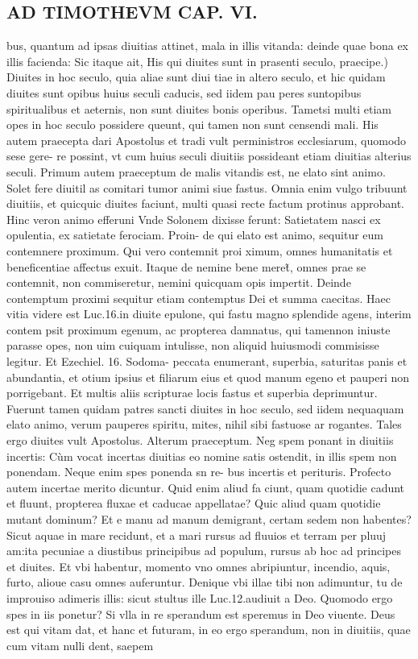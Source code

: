 \documentclass{article}
\begin{document}
\begin{pages}
\section*{AD TIMOTHEVM CAP. VI. }
\marginpar{[ p.131 ]}\pstart bus, quantum ad ipsas diuitias attinet, mala in illis vitanda: deinde quae bona ex illis facienda: Sic itaque ait,  \pend\pstart His qui diuites sunt in prasenti seculo, praecipe.) Diuites in hoc seculo, quia aliae sunt diui tiae in altero seculo, et hic quidam diuites sunt opibus huius seculi caducis, sed iidem pau peres suntopibus spiritualibus et aeternis, non sunt diuites bonis operibus. Tametsi multi etiam opes in hoc seculo possidere queunt, qui tamen non sunt censendi mali. His autem praecepta dari Apostolus et tradi vult perministros ecclesiarum, quomodo sese gere- re possint, vt cum huius seculi diuitiis possideant etiam diuitias alterius seculi.  \pend\pstart Primum autem praeceptum de malis vitandis est, ne elato sint animo. Solet fere diuitil as comitari tumor animi siue fastus. Omnia enim vulgo tribuunt diuitiis, et quicquic diuites faciunt, multi quasi recte factum protinus approbant. Hinc veron animo efferuni Vnde Solonem dixisse ferunt: Satietatem nasci ex opulentia, ex satietate ferociam. Proin- de qui elato est animo, sequitur eum contemnere proximum. Qui vero contemnit proi ximum, omnes humanitatis et beneficentiae affectus exuit. Itaque de nemine bene meret̃, omnes prae se contemnit, non commiseretur, nemini quicquam opis impertit. Deinde contemptum proximi sequitur etiam contemptus Dei et summa caecitas. Haec vitia videre est Luc.16.in diuite epulone, qui fastu magno splendide agens, interim contem psit proximum egenum, ac propterea damnatus, qui tamennon iniuste parasse opes, non uim cuiquam intulisse, non aliquid huiusmodi commisisse legitur. Et Ezechiel. 16. Sodoma- peccata enumerant, superbia, saturitas panis et abundantia, et otium ipsius et filiarum eius et quod manum egeno et pauperi non porrigebant. Et multis aliis scripturae locis fastus et superbia deprimuntur. Fuerunt tamen quidam patres sancti diuites in hoc seculo, sed iidem nequaquam elato animo, verum pauperes spiritu, mites, nihil sibi fastuose ar rogantes. Tales ergo diuites vult Apostolus.  \pend\pstart Alterum praeceptum. Neg spem ponant in diuitiis incertis: Cùm vocat incertas diuitias eo nomine satis ostendit, in illis spem non ponendam. Neque enim spes ponenda sn re- bus incertis et perituris. Profecto autem incertae merito dicuntur. Quid enim aliud fa ciunt, quam quotidie cadunt et fluunt, propterea fluxae et caducae appellatae? Quic aliud quam quotidie mutant dominum? Et e manu ad manum demigrant, certam sedem non habentes? Sicut aquae in mare recidunt, et a mari rursus ad fluuios et terram per pluuj am:ita pecuniae a diustibus principibus ad populum, rursus ab hoc ad principes et diuites. Et vbi habentur, momento vno omnes abripiuntur, incendio, aquis, furto, alioue casu omnes auferuntur. Denique vbi illae tibi non adimuntur, tu de improuiso adimeris illis: sicut stultus ille Luc.12.audiuit a Deo. Quomodo ergo spes in iis ponetur? Si vlla in re sperandum est speremus in Deo viuente. Deus est qui vitam dat, et hanc et futuram, in eo ergo sperandum, non in diuitiis, quae cum vitam nulli dent, saepem 
\end{pages}
\end{document}
